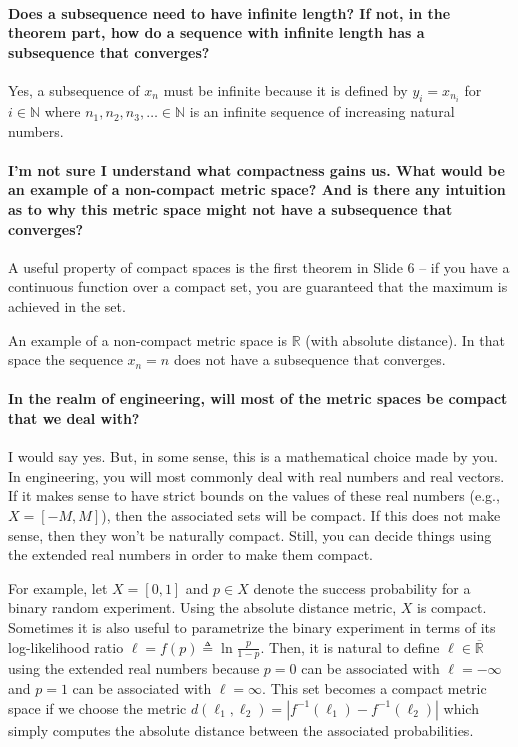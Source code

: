 \documentclass[10pt,english]{article}
\begin{document}
\paragraph{Does a subsequence need to have infinite length? If not, in the theorem part, how do a sequence with infinite length has a subsequence that converges?}
Yes, a subsequence of $x_n$ must be infinite because it is defined by  $y_i = x_{n_i}$ for $i\in \mathbb{N}$ where $n_1 , n_2 , n_3, \ldots \in \mathbb{N}$ is an infinite sequence of increasing natural numbers.


\paragraph{I'm not sure I understand what compactness gains us. What would be an example of a non-compact metric space? And is there any intuition as to why this metric space might not have a subsequence that converges?}
A useful property of compact spaces is the first theorem in Slide 6 -- if you have a continuous function over a compact set, you are guaranteed that the maximum is achieved in the set.

An example of a non-compact metric space is $\mathbb{R}$ (with absolute distance).
In that space the sequence $x_n = n$ does not have a subsequence that converges.


\paragraph{In the realm of engineering, will most of the metric spaces be compact that we deal with?}

I would say yes.
But, in some sense, this is a mathematical choice made by you.
In engineering, you will most commonly deal with real numbers and real vectors.
If it makes sense to have strict bounds on the values of these real numbers (e.g., $X = [-M,M]$), then the associated sets will be compact.
If this does not make sense, then they won't be naturally compact.
Still, you can decide things using the extended real numbers in order to make them compact.

For example, let $X=[0,1]$ and $p \in X$ denote the success probability for a binary random experiment.
Using the absolute distance metric, $X$ is compact.
Sometimes it is also useful to parametrize the binary experiment in terms of its log-likelihood ratio $\ell = f(p) \triangleq \ln \frac{p}{1-p}$.
Then, it is natural to define $\ell \in \overline{\mathbb{R}}$ using the extended real numbers because $p=0$ can be associated with $\ell = -\infty$ and $p=1$ can be associated with $\ell = \infty$.
This set becomes a compact metric space if we choose the metric $d(\ell_1,\ell_2) = |f^{-1}(\ell_1) - f^{-1} (\ell_2) |$ which simply computes the absolute distance between the associated probabilities.
\end{document}
